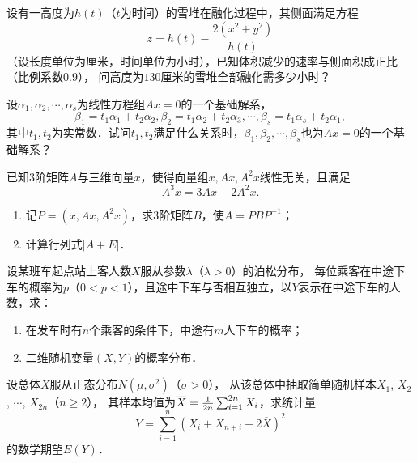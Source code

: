 \documentclass[plain,noanswer,medmath]{../../template/jnuexam}
\begin{document}

\begin{problem}
设有一高度为$h(t)$（$t$为时间）的雪堆在融化过程中，其侧面满足方程
$$z = h(t) - \frac{2(x^2 + y^2)}{h(t)}$$
（设长度单位为厘米，时间单位为小时），已知体积减少的速率与侧面积成正比（比例系数$0.9$），
问高度为$130$厘米的雪堆全部融化需多少小时？
\end{problem}



\begin{problem}
设$\alpha_1,\alpha_2, \cdots ,\alpha_s$为线性方程组$Ax = 0$的一个基础解系，
$$\beta_1 = t_1\alpha_1 + t_2\alpha_2,\beta_2 = t_1\alpha_2 + t_2\alpha_3, \cdots ,\beta_s = t_1\alpha_s + t_2\alpha_1,$$
其中$t_1,t_2$为实常数．试问$t_1,t_2$满足什么关系时，$\beta_1,\beta_2, \cdots ,\beta_s$也为$Ax = 0$的一个基础解系？
\end{problem}



\begin{problem}
已知$3$阶矩阵$A$与三维向量$x$，使得向量组$x,Ax, A^2 x$线性无关，且满足$$A^3 x = 3Ax - 2A^2 x.$$
\begin{enumerate}
\item 记$P = \left(x,Ax, A^2 x \right)$，求$3$阶矩阵$B$，使$A = PB P^{-1}$；
\item 计算行列式$\left| A + E \right|$．
\end{enumerate}
\end{problem}



\begin{problem}
设某班车起点站上客人数$X$服从参数$\lambda$（$\lambda > 0$）的泊松分布，
每位乘客在中途下车的概率为$p$（$0 < p < 1$），且途中下车与否相互独立，以$Y$表示在中途下车的人数，求：
\begin{enumerate}
\item 在发车时有$n$个乘客的条件下，中途有$m$人下车的概率；
\item 二维随机变量$(X,Y)$的概率分布．
\end{enumerate}
\end{problem}



\begin{problem}
设总体$X$服从正态分布$N(\mu ,\sigma^2)$（$\sigma > 0$），
从该总体中抽取简单随机样本$X_1$, $X_2$, $\cdots$, $X_{2n}$（$n \ge 2$），
其样本均值为$\overline{X} = \smash[b]{\frac{1}{2n}\sum_{i = 1}^{2n} X_i}$，求统计量
$$Y = \sum_{i = 1}^n \left(X_i + X_{n + i} - 2\overline{X} \right)^2$$
的数学期望$E(Y)$．
\end{problem}
\end{document}
